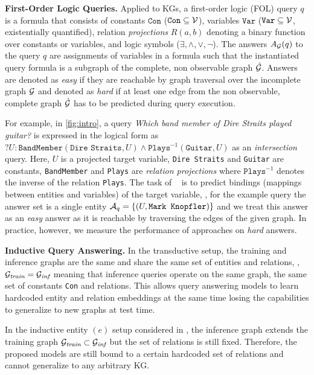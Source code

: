 \textbf{First-Order Logic Queries.}
Applied to KGs, a first-order logic (FOL) query $q$ is a formula that consists of constants $\texttt{Con}$ ($\texttt{Con} \subseteq {\mathcal{V}}$), variables $\texttt{Var}$ ($\texttt{Var} \subseteq {\mathcal{V}}$, existentially quantified), relation \emph{projections} $R(a, b)$ denoting a binary function over constants or variables, and logic symbols ($\exists, \land, \lor, \lnot$).
The answers $A_{{\mathcal{G}}}(q)$ to the query $q$ are assignments of variables in a formula such that the instantiated query formula is a subgraph of the complete, non observable graph $\hat{{\mathcal{G}}}$.
Answers are denoted as \emph{easy} if they are reachable by graph traversal over the incomplete graph ${\mathcal{G}}$ and denoted as \emph{hard} if at least one edge from the non observable, complete graph $\hat{{\mathcal{G}}}$ has to be predicted during query execution.

For example, in \autoref{fig:intro}, a query \emph{Which band member of Dire Straits played guitar?} is expressed in the logical form as $?U:\texttt{BandMember}(\texttt{Dire Straits}, U) \wedge \texttt{Plays}^{-1}(\texttt{Guitar}, U)$ as an \emph{intersection} query. 
Here, $U$ is a projected target variable, \texttt{Dire Straits} and \texttt{Guitar} are constants, \texttt{BandMember} and \texttt{Plays} are \emph{relation projections} where $\texttt{Plays}^{-1}$ denotes the inverse of the relation \texttt{Plays}.
The task of \clqa~ is to predict bindings (mappings between entities and variables) of the target variable, \eg, for the example query the answer set is a single entity ${\mathcal{A}}_{q} = \{(U, \texttt{Mark Knopfler})\}$ and we treat this answer as an \emph{easy} answer as it is reachable by traversing the edges of the given graph.
In practice, however, we measure the performance of \clqa approaches on \emph{hard} answers.

\textbf{Inductive Query Answering.}
In the transductive \clqa setup, the training and inference graphs are the same and share the same set of entities and relations, \ie, $\mathcal{G}_{\textit{train}} = \mathcal{G}_{\textit{inf}}$ meaning that inference queries operate on the same graph, the same set of constants \texttt{Con} and relations.
This allows query answering models to learn hardcoded entity and relation embeddings at the same time losing the capabilities to generalize to new graphs at test time.

In the inductive entity $(e)$ setup considered in \citet{galkin2022}, the inference graph extends the training graph $\mathcal{G}_{\textit{train}} \subset \mathcal{G}_{\textit{inf}}$ but the set of relations is still fixed. Therefore, the proposed models are still bound to a certain hardcoded set of relations and cannot generalize to any arbitrary KG.

